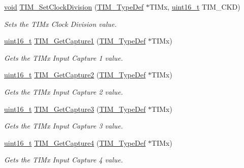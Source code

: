 \begin{DoxyCompactItemize}
\hyperlink{usb__devapi_8h_afabf60e7f57651d6d595a02c75f07cd0}{void} \hyperlink{group___t_i_m___exported___functions_ga20ef804dc32c723662d11ee7da3baab2}{T\+I\+M\+\_\+\+Set\+Clock\+Division} (\hyperlink{struct_t_i_m___type_def}{T\+I\+M\+\_\+\+Type\+Def} $\ast$T\+I\+Mx, \hyperlink{_p_e___types_8h_a1f1825b69244eb3ad2c7165ddc99c956}{uint16\+\_\+t} T\+I\+M\+\_\+\+C\+KD)
\begin{DoxyCompactList}\small\item\em Sets the T\+I\+Mx Clock Division value. \end{DoxyCompactList}\item 
\hyperlink{_p_e___types_8h_a1f1825b69244eb3ad2c7165ddc99c956}{uint16\+\_\+t} \hyperlink{group___t_i_m___exported___functions_ga29eb9f7151ceea94c3988539a5ee91cf}{T\+I\+M\+\_\+\+Get\+Capture1} (\hyperlink{struct_t_i_m___type_def}{T\+I\+M\+\_\+\+Type\+Def} $\ast$T\+I\+Mx)
\begin{DoxyCompactList}\small\item\em Gets the T\+I\+Mx Input Capture 1 value. \end{DoxyCompactList}\item 
\hyperlink{_p_e___types_8h_a1f1825b69244eb3ad2c7165ddc99c956}{uint16\+\_\+t} \hyperlink{group___t_i_m___exported___functions_ga437fcf00ee9d0a9df9150cc120efc5ad}{T\+I\+M\+\_\+\+Get\+Capture2} (\hyperlink{struct_t_i_m___type_def}{T\+I\+M\+\_\+\+Type\+Def} $\ast$T\+I\+Mx)
\begin{DoxyCompactList}\small\item\em Gets the T\+I\+Mx Input Capture 2 value. \end{DoxyCompactList}\item 
\hyperlink{_p_e___types_8h_a1f1825b69244eb3ad2c7165ddc99c956}{uint16\+\_\+t} \hyperlink{group___t_i_m___exported___functions_gab71d1d3d8a15f3be9e74dca51fcca5fa}{T\+I\+M\+\_\+\+Get\+Capture3} (\hyperlink{struct_t_i_m___type_def}{T\+I\+M\+\_\+\+Type\+Def} $\ast$T\+I\+Mx)
\begin{DoxyCompactList}\small\item\em Gets the T\+I\+Mx Input Capture 3 value. \end{DoxyCompactList}\item 
\hyperlink{_p_e___types_8h_a1f1825b69244eb3ad2c7165ddc99c956}{uint16\+\_\+t} \hyperlink{group___t_i_m___exported___functions_ga09049af04c8345849c6f82ccfae242a6}{T\+I\+M\+\_\+\+Get\+Capture4} (\hyperlink{struct_t_i_m___type_def}{T\+I\+M\+\_\+\+Type\+Def} $\ast$T\+I\+Mx)
\begin{DoxyCompactList}\small\item\em Gets the T\+I\+Mx Input Capture 4 value. \end{DoxyCompactList}\item 

\end{DoxyCompactItemize}
